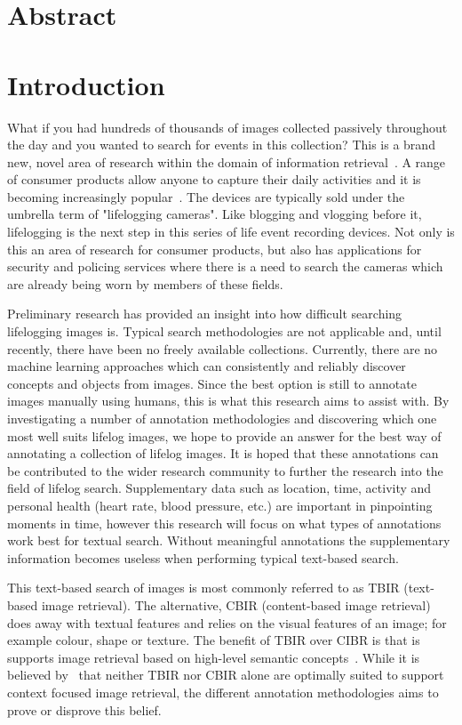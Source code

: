 \chapter{Abstract}

\chapter{Introduction}

What if you had hundreds of thousands of images collected passively throughout the day and you wanted to search for events in this collection? This is a brand new, novel area of research within the domain of information retrieval~\cite{gurrin2014lifelogging}. A range of consumer products allow anyone to capture their daily activities and it is becoming increasingly popular~\cite{gurrin2014lifelogging}\cite{van2014future}\cite{askoxylakis2011log}. The devices are typically sold under the umbrella term of "lifelogging cameras". Like blogging and vlogging before it, lifelogging is the next step in this series of life event recording devices. Not only is this an area of research for consumer products, but also has applications for security and policing services where there is a need to search the cameras which are already being worn by members of these fields.

Preliminary research has provided an insight into how difficult searching lifelogging images is. Typical search methodologies are not applicable and, until recently, there have been no freely available collections. Currently, there are no machine learning approaches which can consistently and reliably discover concepts and objects from images. Since the best option is still to annotate images manually using humans, this is what this research aims to assist with. By investigating a number of annotation methodologies and discovering which one most well suits lifelog images, we hope to provide an answer for the best way of annotating a collection of lifelog images. It is hoped that these annotations can be contributed to the wider research community to further the research into the field of lifelog search. Supplementary data such as location, time, activity and personal health (heart rate, blood pressure, etc.) are important in pinpointing moments in time, however this research will focus on what types of annotations work best for textual search. Without meaningful annotations the supplementary information becomes useless when performing typical text-based search.

This text-based search of images is most commonly referred to as TBIR (text-based image retrieval). The alternative, CBIR (content-based image retrieval) does away with textual features and relies on the visual features of an image; for example colour, shape or texture. The benefit of TBIR over CIBR is that is supports image retrieval based on high-level semantic concepts~\cite{hartvedt2010using}. While it is believed by~\cite{hartvedt2010using} that neither TBIR nor CBIR alone are optimally suited to support context focused image retrieval, the different annotation methodologies aims to prove or disprove this belief.


